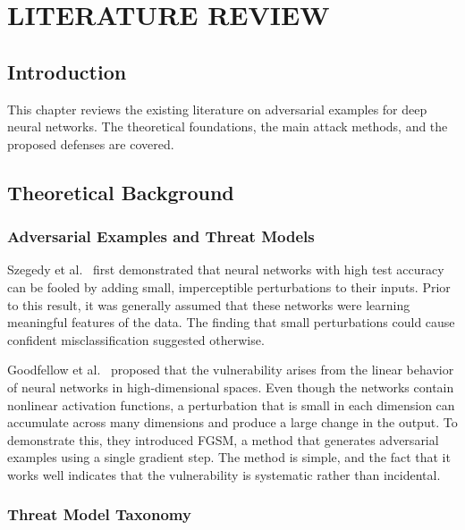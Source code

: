 \chapter{LITERATURE REVIEW}
\label{ch:literature}

\section{Introduction}

This chapter reviews the existing literature on adversarial examples for deep neural networks. The theoretical foundations, the main attack methods, and the proposed defenses are covered.

\section{Theoretical Background}

\subsection{Adversarial Examples and Threat Models}

Szegedy et al.~\cite{szegedy2014intriguing} first demonstrated that neural networks with high test accuracy can be fooled by adding small, imperceptible perturbations to their inputs. Prior to this result, it was generally assumed that these networks were learning meaningful features of the data. The finding that small perturbations could cause confident misclassification suggested otherwise.

Goodfellow et al.~\cite{goodfellow2015explaining} proposed that the vulnerability arises from the linear behavior of neural networks in high-dimensional spaces. Even though the networks contain nonlinear activation functions, a perturbation that is small in each dimension can accumulate across many dimensions and produce a large change in the output. To demonstrate this, they introduced FGSM, a method that generates adversarial examples using a single gradient step. The method is simple, and the fact that it works well indicates that the vulnerability is systematic rather than incidental.

\subsection{Threat Model Taxonomy}

